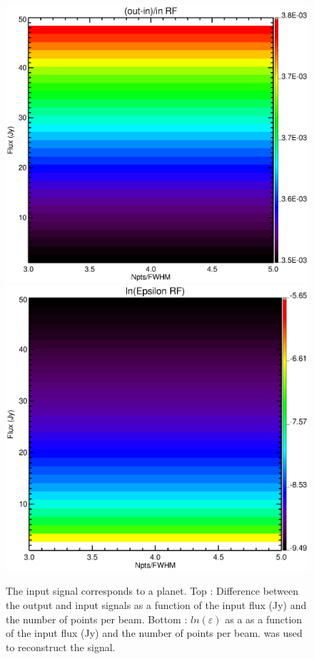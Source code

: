 \begin{figure}[h]
\center
	\includegraphics[scale=0.2]{Figures/diff_rf_planet.eps}
	\includegraphics[scale=0.2]{Figures/epsilon_rf_planet.eps}
	\caption{The input signal corresponds to a planet. Top : Difference between the output and input signals as a function of the input flux (Jy) and the number of points per beam. Bottom : $ln(\varepsilon)$ as a as a function of the input flux (Jy) and the number of points per beam. \cf was used to reconstruct the signal.}
	\label{fig:epsilon-rf-planet}
\end{figure}


